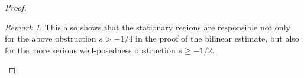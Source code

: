 \documentclass[%
11pt,  reqno]{amsart}
\newcommand{\fia}{\mathbbm{1}_{|\Phi-\alpha|<M}}
\newcommand{\jap}[1]{\langle #1 \rangle}
\newcommand{\5}{\textup{V}}
\newcommand{\noi}{\noindent}
\newcommand{\ind}{\mathbbm 1}
\newcommand{\les}{\lesssim}
\theoremstyle{remark}
\newtheorem{remark}[theorem]{Remark}
\newcommand{\bul}{\bullet}
\newcommand{\al}{\alpha}
\newcommand{\ges}{\gtrsim}
\numberwithin{equation}{section}
\numberwithin{theorem}{section}
\begin{document}
\begin{proof}
\begin{remark}
    This also shows that the stationary regions are responsible not only for the above obstruction $s>-1/4$ in the proof of the bilinear estimate, but also for the more serious well-posedness obstruction $s\ge -1/2$.

\end{remark}









\end{proof}
\end{document}
